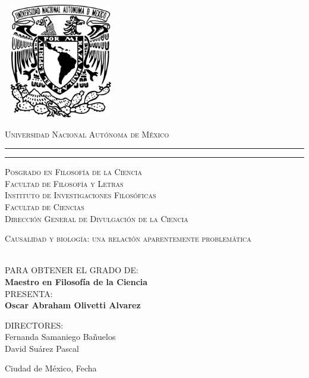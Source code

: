 \thispagestyle{empty}

\begin{center}

	\includegraphics[width=5cm, height=5cm]{Portada/escudo.png}

	{\scshape Universidad Nacional Aut\'onoma de M\'exico}
	\vspace{.3cm}
	\hrule height2.5pt
	\vspace{.1cm}
	\hrule height1pt
	\vspace{.3cm}
	\scshape{Posgrado en Filosofía de la Ciencia \\ Facultad de Filosofía y Letras \\
			Instituto de Investigaciones Filosóficas \\
			Facultad de Ciencias \\
			Dirección General de Divulgación de la Ciencia}

		\vspace{0.5cm}

		{\Large \scshape {Causalidad y biología: una relación aparentemente problemática  }}

		\vspace{0.5cm}

		  \\[8pt]
		PARA OBTENER EL GRADO DE:\\[5pt]
		{\large \textbf{{Maestro en Filosofía de la Ciencia}}}\\[40pt]
		PRESENTA:\\[4pt]
		\textbf{{Oscar Abraham Olivetti Alvarez}}

		\vspace{0.5cm}

		{\small DIRECTORES:\\ {Fernanda Samaniego Bañuelos} \\ {David Suárez Pascal}}

		\vspace{0.5cm}

		{Ciudad de México,}{ }{Fecha}
\end{center}
